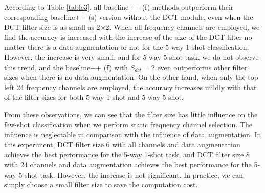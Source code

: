 \documentclass[10pt, conference, compsocconf]{IEEEtran}
\begin{document}
According to Table \ref{table3}, all baseline++ (f) methods outperform their corresponding baseline++ (s) version without the DCT module, even when the DCT filter size is as small as 2$\times$2. When all frequency channels are employed, we find the accuracy is increased with the increase of the size of the DCT filter no matter there is a data augmentation or not for the 5-way 1-shot classification. However, the increase is very small, and for 5-way 5-shot task, we do not observe this trend, and the baseline++ (f) with $S_{dct} = 2$ even outperforms other filter sizes when there is no data augmentation. On the other hand, when only the top left 24 frequency channels are employed, the accuracy increases mildly with that of the filter sizes for both 5-way 1-shot and 5-way 5-shot.

From these observations, we can see that the filter size has little influence on the few-shot classification when we perform static frequency channel selection. The influence is neglectable in comparison with the influence of data augmentation. In this experiment, DCT filter size 6 with all channels and data augmentation achieves the best performance for the 5-way 1-shot task, and DCT filter size 8 with 24 channels and data augmentation achieves the best performance for the 5-way 5-shot task. However, the increase is not significant. In practice, we can simply choose a small filter size to save the computation cost.
\end{document}
